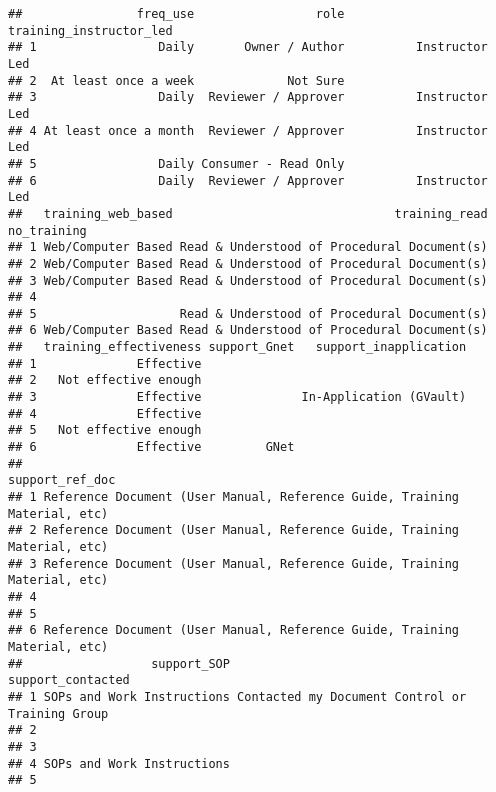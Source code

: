 \documentclass[
]{article}
\begin{document}
\begin{verbatim}
##                freq_use                 role training_instructor_led
## 1                 Daily       Owner / Author          Instructor Led
## 2  At least once a week             Not Sure                        
## 3                 Daily  Reviewer / Approver          Instructor Led
## 4 At least once a month  Reviewer / Approver          Instructor Led
## 5                 Daily Consumer - Read Only                        
## 6                 Daily  Reviewer / Approver          Instructor Led
##   training_web_based                               training_read no_training
## 1 Web/Computer Based Read & Understood of Procedural Document(s)            
## 2 Web/Computer Based Read & Understood of Procedural Document(s)            
## 3 Web/Computer Based Read & Understood of Procedural Document(s)            
## 4                                                                           
## 5                    Read & Understood of Procedural Document(s)            
## 6 Web/Computer Based Read & Understood of Procedural Document(s)            
##   training_effectiveness support_Gnet   support_inapplication
## 1              Effective                                     
## 2   Not effective enough                                     
## 3              Effective              In-Application (GVault)
## 4              Effective                                     
## 5   Not effective enough                                     
## 6              Effective         GNet                        
##                                                             support_ref_doc
## 1 Reference Document (User Manual, Reference Guide, Training Material, etc)
## 2 Reference Document (User Manual, Reference Guide, Training Material, etc)
## 3 Reference Document (User Manual, Reference Guide, Training Material, etc)
## 4                                                                          
## 5                                                                          
## 6 Reference Document (User Manual, Reference Guide, Training Material, etc)
##                  support_SOP                               support_contacted
## 1 SOPs and Work Instructions Contacted my Document Control or Training Group
## 2                                                                           
## 3                                                                           
## 4 SOPs and Work Instructions                                                
## 5                                                                           

\end{verbatim}
\end{document}
